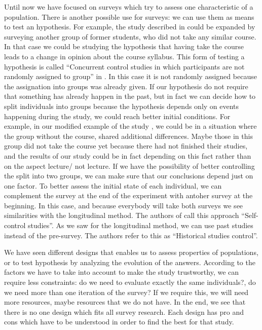 \documentclass{report}
\begin{document}
Until now we have focused on surveys which try to assess one characteristic of a population. There is another possible use for surveys: we can use them as means to test an hypothesis.
For example, the study described in \cite{DBLP:dblp_conf/er/TortOP13} could be expanded by surveying another group of former students, who did not take any similar course. In that case we could be studying the hypothesis that having take the course leads to a change in opinion about the course syllabus. This form of testing a hypothesis is  called “Concurrent control studies in which participants are not randomly assigned to group” in \cite{Kitchenham2002}. In this case it is not randomly assigned because the assignation into groups was already given.
If our hypothesis do not require that something has already happen in the past, but in fact we can decide how to split individuals into groups because the hypothesis depends only on events happening during the study, we could reach better initial conditions. For example, in our modified example of the study \cite{DBLP:dblp_conf/er/TortOP13}, we could be in a situation where the group without the course, shared additional differences. Maybe those in this group did not take the course yet because there had not finished their studies, and the results of our study could be in fact depending on this fact rather than on the aspect lecture/ not lecture. If we have the possibility of better controlling the split into two groups, we can make sure that our conclusions depend just on one factor.
To better assess the initial state of each individual, we can complement the survey at the end of the experiment with antoher survey at the beginning. In this case, and because everybody will take both surveys we see similarities with the longitudinal method. The authors of \cite{Kitchenham2002} call this approach “Self-control studies”. As we saw for the longitudinal method, we can use past studies instead of the pre-survey. The authors refer to this as “Historical studies control”.

We have seen different designs that enables us to assess properties of populations, or to test hypothesis by analyzing the evolution of the answers. According to the factors we have to take into account to make the study trustworthy, we can require less constraints: do we need to evaluate exactly the same individuals?, do we need more than one iteration of the survey? If we require this, we will need more resources, maybe resources that we do not have. In the end, we see that there is no one design which fits all survey research. Each design has pro and cons which have to be understood in order to find the best for that study.
\end{document}
